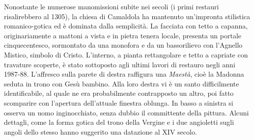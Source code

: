 \documentclass[10pt,b6paper,usenames,twoside]{article}
\begin{document}
Nonostante le numerose manomissioni subite nei secoli (i primi restauri risalirebbero al 1305), la chiesa di Camaldola ha mantenuto un’impronta stilistica romanico-gotica ed è dominata dalla semplicità. La facciata con tetto a capanna, originariamente a mattoni a vista e in pietra tenera locale, presenta un portale cinquecentesco, sormontato da una monofora e da un bassorilievo con l’Agnello Mistico, simbolo di Cristo. L’interno, a pianta rettangolare e tetto a capriate con travature scoperte, è stato sottoposto agli ultimi lavori di restauro negli anni 1987-88. L’affresco sulla parete di destra raffigura una \textit{Maestà}, cioè la Madonna seduta in trono con Gesù bambino. Alla loro destra vi è un santo difficilmente identificabile, al quale ne era probabilmente contrapposto un altro, poi fatto scomparire con l’apertura dell’attuale finestra oblunga. In basso a sinistra si osserva un uomo inginocchiato, senza dubbio il committente della pittura. Alcuni dettagli, come la forma gotica del trono della Vergine e i due angioletti sugli angoli dello stesso hanno suggerito una datazione al XIV secolo.\\ 
\end{document}
